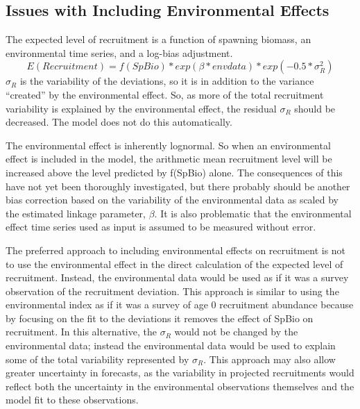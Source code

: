 \subsection{Issues with Including Environmental Effects}
The expected level of recruitment is a function of spawning biomass, an environmental time series, and a log-bias adjustment.
\begin{equation}
	E(Recruitment) = f(SpBio) * exp(\beta*envdata) * exp(-0.5*\sigma_R^2)
\end{equation}
$\sigma_R$ is the variability of the deviations, so it is in addition to the variance “created” by the environmental effect.  So, as more of the total recruitment variability is explained by the environmental effect, the residual $\sigma_R$ should be decreased.  The model does not do this automatically.

The environmental effect is inherently lognormal.  So when an environmental effect is included in the model, the arithmetic mean recruitment level will be increased above the level predicted by f(SpBio) alone.  The consequences of this have not yet been thoroughly investigated, but there probably should be another bias correction based on the variability of the environmental data as scaled by the estimated linkage parameter, $\beta$.  It is also problematic that the environmental effect time series used as input is assumed to be measured without error.

The preferred approach to including environmental effects on recruitment is not to use the environmental effect in the direct calculation of the expected level of recruitment.  Instead, the environmental data would be used as if it was a survey observation of the recruitment deviation.  This approach is similar to using the environmental index as if it was a survey of age 0 recruitment abundance because by focusing on the fit to the deviations it removes the effect of SpBio on recruitment.  In this alternative, the $\sigma_R$ would not be changed by the environmental data; instead the environmental data would be used to explain some of the total variability represented by $\sigma_R$.  This approach may also allow greater uncertainty in forecasts, as the variability in projected recruitments would reflect both the uncertainty in the environmental observations themselves and the model fit to these observations.

